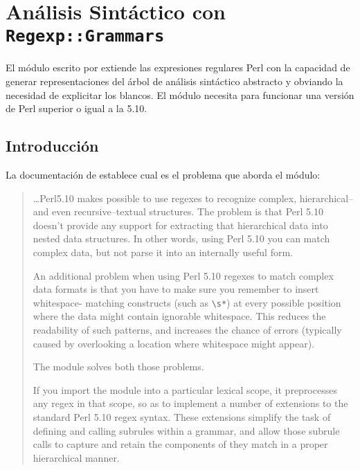 \section{Análisis Sintáctico con {\tt Regexp::Grammars}}

El módulo  escrito por  extiende
las expresiones regulares Perl con 
la capacidad de generar representaciones del árbol 
de análisis sintáctico abstracto y obviando la necesidad 
de explicitar los blancos. El módulo necesita para funcionar una versión de Perl superior
o igual a la 5.10. 

\subsection{Introducción}


La documentación de \regexpg{} establece cual es el problema que aborda 
el módulo:
\begin{it}\begin{quotation}
\ldots Perl5.10 makes possible to use regexes to recognize complex,
hierarchical--and even recursive--textual structures. The problem is that
Perl 5.10 doesn’t provide any support for extracting that
hierarchical data into nested data structures. In other words,
using Perl 5.10 you can match complex data, but not parse it into an internally useful form.

An additional problem when using Perl 5.10 regexes to match
complex data formats is that you have to make sure you remember
to insert whitespace- matching constructs (such as \verb"\s*") at every
possible position where the data might contain ignorable whitespace. This
reduces the readability of such patterns, and increases the chance of
errors (typically caused by overlooking a location where whitespace
might appear).


The \regexpg{} module solves both those problems.

If you import the module into a particular lexical scope, it preprocesses
any regex in that scope, so as to implement a number of extensions to the
standard Perl 5.10 regex syntax. These extensions simplify the task of
defining and calling subrules within a grammar, and allow those subrule
calls to capture and retain the components of they match in a proper
hierarchical manner.

\end{quotation}\end{it}


